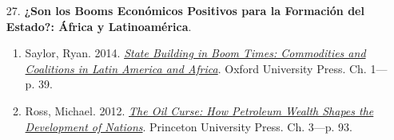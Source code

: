 \documentclass[letterpaper]{article}
\begin{document}
\begin{enumerate}
\begin{enumerate}
			\item[27.] {\bf ¿Son los Booms Econ\'omicos Positivos para la Formaci\'on del Estado?: \'Africa y Latinoam\'erica}.
				\begin{enumerate}
					\item Saylor, Ryan. 2014. \href{https://github.com/hbahamonde/Ciencia_Politica_I/raw/master/Readings/Saylor.pdf}{\emph{State Building in Boom Times: Commodities and Coalitions in Latin America and Africa}}. Oxford University Press. Ch. 1---p. 39.
					
					\item Ross, Michael. 2012. \href{https://github.com/hbahamonde/Ciencia_Politica_I/raw/master/Readings/Ross_2012.epub}{\emph{The Oil Curse: How Petroleum Wealth Shapes the Development of Nations}}. Princeton University Press. Ch. 3---p. 93.
				\end{enumerate}
		

		\end{enumerate}

{\huge{\color{blue}\Pointinghand}} {\large{}}

\end{enumerate}



			


			



\newpage
{}
\setcounter{page}{1}
\printbibliography
\end{document}
